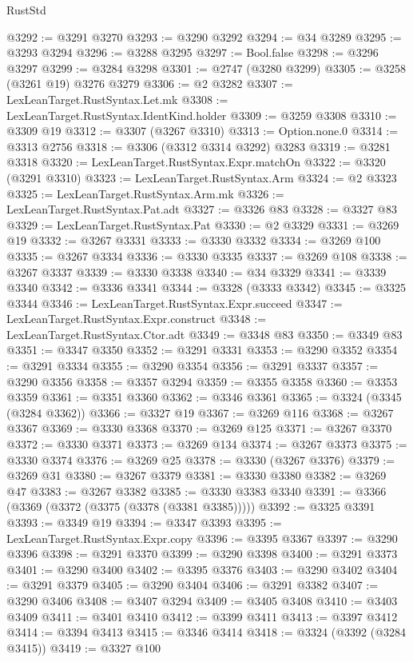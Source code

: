 \begin{lexlean}{RustStd}
\begin{coremodule}
@3292 := @3291 @3270
@3293 := @3290 @3292
@3294 := @34 @3289
@3295 := @3293 @3294
@3296 := @3288 @3295
@3297 := Bool.false
@3298 := @3296 @3297
@3299 := @3284 @3298
@3301 := @2747 (@3280 @3299)
@3305 := @3258 (@3261 @19) @3276 @3279
@3306 := @2 @3282
@3307 := LexLeanTarget.RustSyntax.Let.mk
@3308 := LexLeanTarget.RustSyntax.IdentKind.holder
@3309 := @3259 @3308
@3310 := @3309 @19
@3312 := @3307 (@3267 @3310)
@3313 := Option.none.{0}
@3314 := @3313 @2756
@3318 := @3306 (@3312 @3314 @3292) @3283
@3319 := @3281 @3318
@3320 := LexLeanTarget.RustSyntax.Expr.matchOn
@3322 := @3320 (@3291 @3310)
@3323 := LexLeanTarget.RustSyntax.Arm
@3324 := @2 @3323
@3325 := LexLeanTarget.RustSyntax.Arm.mk
@3326 := LexLeanTarget.RustSyntax.Pat.adt
@3327 := @3326 @83
@3328 := @3327 @83
@3329 := LexLeanTarget.RustSyntax.Pat
@3330 := @2 @3329
@3331 := @3269 @19
@3332 := @3267 @3331
@3333 := @3330 @3332
@3334 := @3269 @100
@3335 := @3267 @3334
@3336 := @3330 @3335
@3337 := @3269 @108
@3338 := @3267 @3337
@3339 := @3330 @3338
@3340 := @34 @3329
@3341 := @3339 @3340
@3342 := @3336 @3341
@3344 := @3328 (@3333 @3342)
@3345 := @3325 @3344
@3346 := LexLeanTarget.RustSyntax.Expr.succeed
@3347 := LexLeanTarget.RustSyntax.Expr.construct
@3348 := LexLeanTarget.RustSyntax.Ctor.adt
@3349 := @3348 @83
@3350 := @3349 @83
@3351 := @3347 @3350
@3352 := @3291 @3331
@3353 := @3290 @3352
@3354 := @3291 @3334
@3355 := @3290 @3354
@3356 := @3291 @3337
@3357 := @3290 @3356
@3358 := @3357 @3294
@3359 := @3355 @3358
@3360 := @3353 @3359
@3361 := @3351 @3360
@3362 := @3346 @3361
@3365 := @3324 (@3345 (@3284 @3362))
@3366 := @3327 @19
@3367 := @3269 @116
@3368 := @3267 @3367
@3369 := @3330 @3368
@3370 := @3269 @125
@3371 := @3267 @3370
@3372 := @3330 @3371
@3373 := @3269 @134
@3374 := @3267 @3373
@3375 := @3330 @3374
@3376 := @3269 @25
@3378 := @3330 (@3267 @3376)
@3379 := @3269 @31
@3380 := @3267 @3379
@3381 := @3330 @3380
@3382 := @3269 @47
@3383 := @3267 @3382
@3385 := @3330 @3383 @3340
@3391 := @3366 (@3369 (@3372 (@3375 (@3378 (@3381 @3385)))))
@3392 := @3325 @3391
@3393 := @3349 @19
@3394 := @3347 @3393
@3395 := LexLeanTarget.RustSyntax.Expr.copy
@3396 := @3395 @3367
@3397 := @3290 @3396
@3398 := @3291 @3370
@3399 := @3290 @3398
@3400 := @3291 @3373
@3401 := @3290 @3400
@3402 := @3395 @3376
@3403 := @3290 @3402
@3404 := @3291 @3379
@3405 := @3290 @3404
@3406 := @3291 @3382
@3407 := @3290 @3406
@3408 := @3407 @3294
@3409 := @3405 @3408
@3410 := @3403 @3409
@3411 := @3401 @3410
@3412 := @3399 @3411
@3413 := @3397 @3412
@3414 := @3394 @3413
@3415 := @3346 @3414
@3418 := @3324 (@3392 (@3284 @3415))
@3419 := @3327 @100

\end{coremodule}
\end{lexlean}
